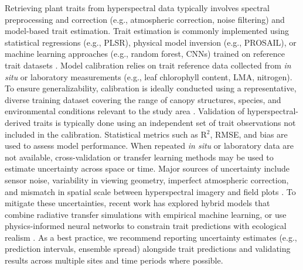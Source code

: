 \documentclass[pdflatex,sn-mathphys-num]{sn-jnl}%
\theoremstyle{thmstyleone}%
\theoremstyle{thmstyletwo}%
\theoremstyle{thmstylethree}%
\begin{document}
Retrieving plant traits from hyperspectral data typically involves spectral preprocessing and correction (e.g., atmospheric correction, noise filtering) and model-based trait estimation. Trait estimation is commonly implemented using statistical regressions (e.g., PLSR), physical model inversion (e.g., PROSAIL), or machine learning approaches (e.g., random forest, CNNs) trained on reference trait datasets \citep{Blackburn2007, LeMaire2004, Cherif2023}. Model calibration relies on trait reference data collected from \textit{in situ} or laboratory measurements (e.g., leaf chlorophyll content, LMA, nitrogen). To ensure generalizability, calibration is ideally conducted using a representative, diverse training dataset covering the range of canopy structures, species, and environmental conditions relevant to the study area \citep{Verrelst2015, Kattenborn2019}. Validation of hyperspectral-derived traits is typically done using an independent set of trait observations not included in the calibration. Statistical metrics such as R$^2$, RMSE, and bias are used to assess model performance. When repeated \textit{in situ} or laboratory data are not available, cross-validation or transfer learning methods may be used to estimate uncertainty across space or time. Major sources of uncertainty include sensor noise, variability in viewing geometry, imperfect atmospheric correction, and mismatch in spatial scale between hyperspectral imagery and field plots \citep{Schweiger2020, Mederer2025}. To mitigate these uncertainties, recent work has explored hybrid models that combine radiative transfer simulations with empirical machine learning, or use physics-informed neural networks to constrain trait predictions with ecological realism \citep{Sun2024, She2024}. As a best practice, we recommend reporting uncertainty estimates (e.g., prediction intervals, ensemble spread) alongside trait predictions and validating results across multiple sites and time periods where possible.
\end{document}

